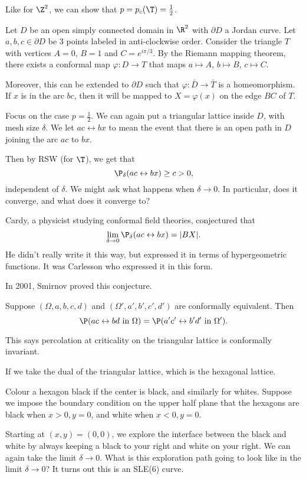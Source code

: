 \documentclass[a4paper]{article}
\begin{document}
Like for $\Z^2$, we can show that $p = p_c(\T) = \frac{1}{2}$.

Let $D$ be an open simply connected domain in $\R^2$ with $\partial D$ a Jordan curve. Let $a, b, c \in \partial D$ be $3$ points labeled in anti-clockwise order. Consider the triangle $T$ with vertices $A = 0$, $B = 1$ and $C = e^{i\pi/3}$. By the Riemann mapping theorem, there exists a conformal map $\varphi: D \to T$ that maps $a \mapsto A$, $b \mapsto B$, $c \mapsto C$.

Moreover, this can be extended to $\partial D$ such that $\varphi: \bar{D} \to \bar{T}$ is a homeomorphism. If $x$ is in the arc $bc$, then it will be mapped to $X = \varphi(x)$ on the edge $BC$ of $T$.

Focus on the case $p = \frac{1}{2}$. We can again put a triangular lattice inside $D$, with mesh size $\delta$. We let $ac \leftrightarrow bx$ to mean the event that there is an open path in $D$ joining the arc $ac$ to $bx$.

Then by RSW (for $\T$), we get that
\[
  \P_\delta(ac \leftrightarrow bx) \geq c > 0,
\]
independent of $\delta$. We might ask what happens when $\delta \to 0$. In particular, does it converge, and what does it converge to?

Cardy, a physicist studying conformal field theories, conjectured that
\[
  \lim_{\delta \to 0} \P_\delta(ac \leftrightarrow bx) = |BX|.
\]
He didn't really write it this way, but expressed it in terms of hypergeometric functions. It was Carlesson who expressed it in this form.

In 2001, Smirnov proved this conjecture.

\begin{thm}[Smirnov, 2001]
  Suppose $(\Omega, a, b, c, d)$ and $(\Omega', a', b', c', d')$ are conformally equivalent. Then
  \[
    \P(ac \leftrightarrow bd\text{ in }\Omega) = \P(a' c' \leftrightarrow b' d'\text{ in }\Omega').
  \]
\end{thm}
This says percolation at criticality on the triangular lattice is conformally invariant.

If we take the dual of the triangular lattice, which is the hexagonal lattice. %

Colour a hexagon black if the center is black, and similarly for whites. Suppose we impose the boundary condition on the upper half plane that the hexagons are black when $x > 0, y = 0$, and white when $x < 0, y = 0$.

Starting at $(x, y) = (0, 0)$, we explore the interface between the black and white by always keeping a black to your right and white on your right. We can again take the limit $\delta \to 0$. What is this exploration path going to look like in the limit $\delta \to 0$? It turns out this is an SLE(6) curve.
\end{document}
